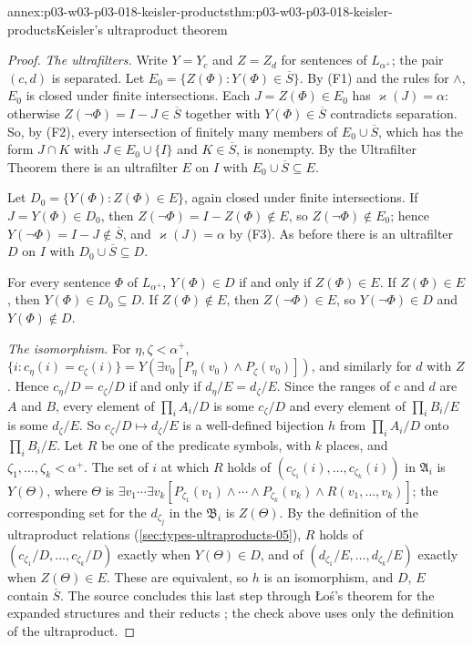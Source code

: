 \begin{annexitem}{annex:p03-w03-p03-018-keisler-products}{thm:p03-w03-p03-018-keisler-products}{Keisler's ultraproduct theorem}
\begin{proof}
\emph{The ultrafilters.}  Write \(Y=Y_c\) and \(Z=Z_d\) for sentences of
\(L_{\alpha^+}\); the pair \((c,d)\) is separated.  Let
\(E_0=\{Z(\Phi):Y(\Phi)\in\overline S\}\).  By (F1) and the rules for
\(\wedge\), \(E_0\) is closed under finite intersections.  Each
\(J=Z(\Phi)\in E_0\) has \(\varkappa(J)=\alpha\): otherwise
\(Z(\neg\Phi)=I-J\in\overline S\) together with \(Y(\Phi)\in\overline S\)
contradicts separation.  So, by (F2), every intersection of finitely many
members of \(E_0\cup\overline S\), which has the form \(J\cap K\) with
\(J\in E_0\cup\{I\}\) and \(K\in\overline S\), is nonempty.  By the
Ultrafilter Theorem \cite[480]{Keisler1961ElementaryClasses} there is an
ultrafilter \(E\) on \(I\) with \(E_0\cup\overline S\subseteq E\).

Let \(D_0=\{Y(\Phi):Z(\Phi)\in E\}\), again closed under finite
intersections.  If \(J=Y(\Phi)\in D_0\), then \(Z(\neg\Phi)=I-Z(\Phi)\notin
E\), so \(Z(\neg\Phi)\notin E_0\); hence \(Y(\neg\Phi)=I-J\notin\overline
S\), and \(\varkappa(J)=\alpha\) by (F3).  As before there is an ultrafilter
\(D\) on \(I\) with \(D_0\cup\overline S\subseteq D\).

For every sentence \(\Phi\) of \(L_{\alpha^+}\), \(Y(\Phi)\in D\) if and only
if \(Z(\Phi)\in E\).  If \(Z(\Phi)\in E\), then \(Y(\Phi)\in D_0\subseteq D\).
If \(Z(\Phi)\notin E\), then \(Z(\neg\Phi)\in E\), so
\(Y(\neg\Phi)\in D\) and \(Y(\Phi)\notin D\).

\emph{The isomorphism.}  For \(\eta,\zeta<\alpha^+\),
\(\{i:c_\eta(i)=c_\zeta(i)\}=Y(\exists v_0[P_\eta(v_0)\wedge
P_\zeta(v_0)])\), and similarly for \(d\) with \(Z\).  Hence
\(c_\eta/D=c_\zeta/D\) if and only if \(d_\eta/E=d_\zeta/E\).  Since the
ranges of \(c\) and \(d\) are \(A\) and \(B\), every element of
\(\prod_iA_i/D\) is some \(c_\zeta/D\) and every element of
\(\prod_iB_i/E\) is some \(d_\zeta/E\).  So \(c_\zeta/D\mapsto d_\zeta/E\)
is a well-defined bijection \(h\) from \(\prod_iA_i/D\) onto
\(\prod_iB_i/E\).  Let \(R\) be one of the predicate symbols, with \(k\)
places, and \(\zeta_1,\ldots,\zeta_k<\alpha^+\).  The set of \(i\) at which
\(R\) holds of \((c_{\zeta_1}(i),\ldots,c_{\zeta_k}(i))\) in
\(\mathfrak A_i\) is \(Y(\Theta)\), where \(\Theta\) is
\(\exists v_1\cdots\exists v_k[P_{\zeta_1}(v_1)\wedge\cdots\wedge
P_{\zeta_k}(v_k)\wedge R(v_1,\ldots,v_k)]\); the corresponding set for the
\(d_{\zeta_j}\) in the \(\mathfrak B_i\) is \(Z(\Theta)\).  By the definition
of the ultraproduct relations (\cref{sec:types-ultraproducts-05}), \(R\) holds
of \((c_{\zeta_1}/D,\ldots,c_{\zeta_k}/D)\) exactly when \(Y(\Theta)\in D\),
and of \((d_{\zeta_1}/E,\ldots,d_{\zeta_k}/E)\) exactly when
\(Z(\Theta)\in E\).  These are equivalent, so \(h\) is an isomorphism, and
\(D\), \(E\) contain \(\overline S\).  The source concludes this last step
through \L o\'s's theorem for the expanded structures and their reducts
\cite[486]{Keisler1961ElementaryClasses}; the check above uses only the
definition of the ultraproduct.
\end{proof}
\end{annexitem}

